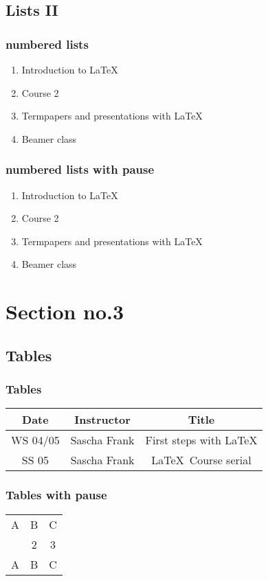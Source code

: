 \documentclass{beamer}
\begin{document}
\subsection{Lists II}
\begin{frame}\frametitle{numbered lists}
\begin{enumerate}
\item Introduction to  \LaTeX  
\item Course 2 
\item Termpapers and presentations with \LaTeX 
\item Beamer class
\end{enumerate}
\end{frame}

\begin{frame}\frametitle{numbered lists with pause}
\begin{enumerate}
\item Introduction to  \LaTeX \pause 
\item Course 2 \pause 
\item Termpapers and presentations with \LaTeX \pause 
\item Beamer class
\end{enumerate}
\end{frame}

\section{Section no.3} 
\subsection{Tables}
\begin{frame}\frametitle{Tables}
\begin{tabular}{|c|c|c|}
\hline
\textbf{Date} & \textbf{Instructor} & \textbf{Title} \\
\hline
WS 04/05 & Sascha Frank & First steps with  \LaTeX  \\
\hline
SS 05 & Sascha Frank & \LaTeX \ Course serial \\
\hline
\end{tabular}
\end{frame}


\begin{frame}\frametitle{Tables with pause}
\begin{tabular}{c c c}
A & B & C \\ 
\pause 
1 & 2 & 3 \\  
\pause 
A & B & C \\ 
\end{tabular} 
\end{frame}
\end{document}
